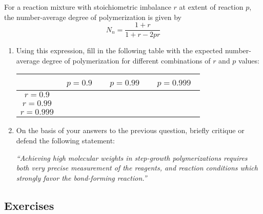 	
	For a reaction mixture with stoichiometric imbalance $r$ at extent of reaction $p$, the number-average degree of polymerization is given by
	\begin{equation*}
		N_n = \frac{1+r}{1+r-2pr}
	\end{equation*}
	
	\begin{enumerate}[resume]
		\item Using this expression, fill in the following table with the expected number-average degree of polymerization for different combinations of $r$ and $p$ values:
		
			\begin{table}[!h]
				\centering
				\renewcommand{\arraystretch}{3}
				\begin{tabular}{|c|c|c|c|}
					\hline
					 &  ~$p=0.9$~ & ~$p=0.99$~ & ~$p=0.999$~ \\\hline
					$r=0.9$ &&& \\\hline
					$r=0.99$ &&& \\\hline
					$r=0.999$ &&& \\\hline
				\end{tabular}
			\end{table}
		
		\item On the basis of your answers to the previous question, briefly critique or defend the following statement:
		
			\emph{``Achieving high molecular weights in step-growth polymerizations requires both very precise measurement of the reagents, and reaction conditions which strongly favor the bond-forming reaction.''}
			
	\end{enumerate}

\subsection{Exercises}

	
	
